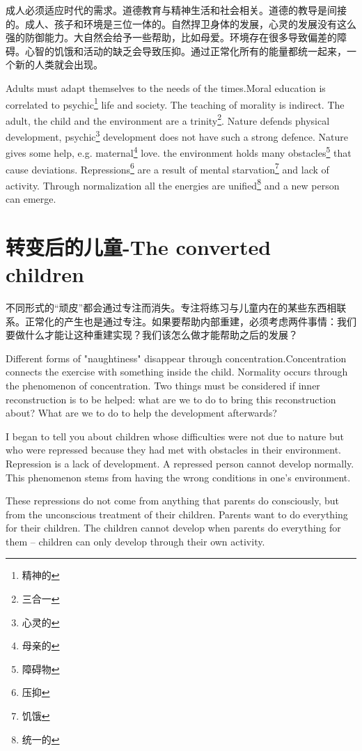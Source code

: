 \documentclass[lang=cn,10pt]{elegantbook}
\begin{document}
成人必须适应时代的需求。道德教育与精神生活和社会相关。道德的教导是间接的。成人、孩子和环境是三位一体的。自然捍卫身体的发展，心灵的发展没有这么强的防御能力。大自然会给予一些帮助，比如母爱。环境存在很多导致偏差的障碍。心智的饥饿和活动的缺乏会导致压抑。通过正常化所有的能量都统一起来，一个新的人类就会出现。

Adults must adapt themselves to the needs of the times.Moral education is correlated to psychic\footnote{精神的} life and society. The teaching of morality is indirect. The adult, the child and the environment are a trinity\footnote{三合一}. Nature defends physical development, psychic\footnote{心灵的} development does not have such a strong defence. Nature gives some help, e.g. maternal\footnote{母亲的} love. the environment holds many obstacles\footnote{障碍物} that cause deviations. Repressions\footnote{压抑} are a result of mental starvation\footnote{饥饿} and lack of activity. Through normalization all the energies are unified\footnote{统一的} and a new person can emerge.

\chapter{转变后的儿童-The converted children}

不同形式的“顽皮”都会通过专注而消失。专注将练习与儿童内在的某些东西相联系。正常化的产生也是通过专注。如果要帮助内部重建，必须考虑两件事情：我们要做什么才能让这种重建实现？我们该怎么做才能帮助之后的发展？

Different forms of "naughtiness" disappear through concentration.Concentration connects the exercise with something inside the child. Normality occurs through the phenomenon of concentration. Two things must be considered if inner reconstruction is to be helped: what are we to do to bring this reconstruction about? What are we to do to help the development afterwards?

I began to tell you about children whose difficulties were not due to
nature but who were repressed because they had met with obstacles
in their environment. Repression is a lack of development. A
repressed person cannot develop normally. This phenomenon stems
from having the wrong conditions in one’s environment.

These repressions do not come from anything that parents do
consciously, but from the unconscious treatment of their children.
Parents want to do everything for their children. The children cannot
develop when parents do everything for them – children can only
develop through their own activity.
\end{document}
